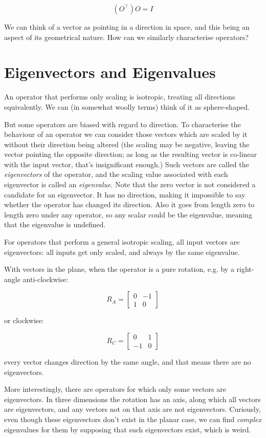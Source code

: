$$
(O^\intercal) O = I
$$

We can think of a vector as pointing in a direction in space, and this being an aspect of its geometrical nature. How can we similarly characterise operators?

\section{Eigenvectors and Eigenvalues}\label{sec:vectors-eigen}

An operator that performs only scaling is isotropic, treating all directions equivalently. We can (in somewhat woolly terms) think of it as sphere-shaped.

But some operators are biased with regard to direction. To characterise the behaviour of an operator we can consider those vectors which are scaled by it without their direction being altered (the scaling may be negative, leaving the vector pointing the opposite direction; as long as the resulting vector is co-linear with the input vector, that's insignificant enough.) Such vectors are called the \textit{eigenvectors} of the operator, and the scaling value associated with each eigenvector is called an \textit{eigenvalue}. Note that the zero vector is not considered a candidate for an eigenvector. It has no direction, making it impossible to say whether the operator has changed its direction. Also it goes from length zero to length zero under any operator, so any scalar could be the eigenvalue, meaning that the eigenvalue is undefined.

For operators that perform a general isotropic scaling, all input vectors are eigenvectors: all inputs get only scaled, and always by the same eigenvalue.

With vectors in the plane, when the operator is a pure rotation, e.g. by a right-angle anti-clockwise:

$$R_A = \begin{bmatrix}0 & -1 \\ 1 & 0\end{bmatrix}$$

or clockwise:

$$R_C = \begin{bmatrix}0 & 1 \\ -1 & 0\end{bmatrix}$$

every vector changes direction by the same angle, and that means there are no eigenvectors.

More interestingly, there are operators for which only some vectors are eigenvectors. In three dimensions the rotation has an axis, along which all vectors are eigenvectors, and any vectors not on that axis are not eigenvectors. Curiously, even though these eigenvectors don't exist in the planar case, we can find \textit{complex} eigenvalues for them by supposing that such eigenvectors exist, which is weird.

